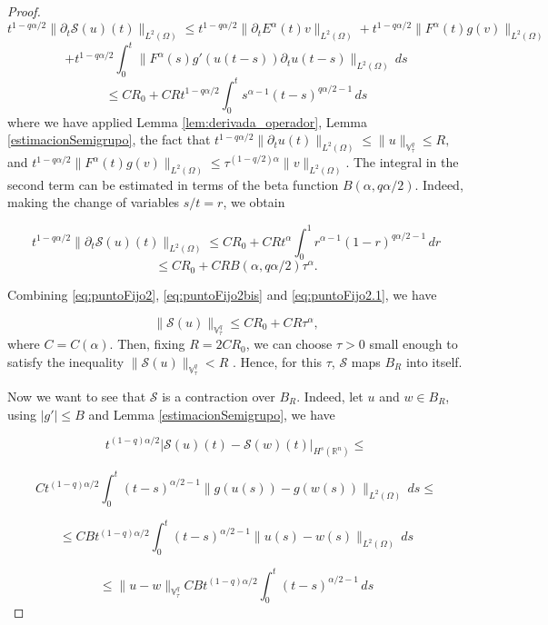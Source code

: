 \documentclass{amsart}
\newcommand{\rn}{{\mathbb{R}^n}}
\newcommand{\ele}{L^2(\Omega)}
\newcommand{\fmonio}{g}
\newcommand{\V}{\mathbb{V}^q}
\theoremstyle{remark}
\theoremstyle{definition}
\numberwithin{equation}{section}
\begin{document}
\begin{proof}
\begin{equation*}
t^{1-q\alpha/2}\| \partial_t \mathcal{S}(u)(t) \|_{\ele} \leq t^{1-q\alpha/2}\|\partial_t E^{\alpha}(t)v\|_{\ele}+ t^{1-q\alpha/2}\| F^{\alpha}(t)\fmonio(v)\|_{\ele} 
\end{equation*}
$$+ t^{1-q\alpha/2}\int^{t}_0 \|F^{\alpha}(s)\fmonio'(u(t-s))\partial_t u(t-s)\|_{\ele}\,ds $$
$$\leq CR_0 + CRt^{1-q\alpha/2}\int^{t}_0 s^{\alpha - 1}(t-s)^{q\alpha/2-1}\,ds  $$
where we have applied Lemma \ref{lem:derivada_operador}, Lemma \ref{estimacionSemigrupo}, the fact that $t^{1-q\alpha/2}\|\partial_t u(t)\|_{\ele} \leq \|u\|_{\V_{\tau}} \leq R,$
 and $t^{1-q\alpha/2}\|F^{\alpha}(t)\fmonio(v)\|_{\ele} \leq \tau^{(1-q/2)\alpha}\|v\|_{\ele}$.
The integral in the second term can be estimated in terms of the beta function $B(\alpha,q\alpha/2)$. Indeed, making the change of variables $s/t = r$, we obtain 

\begin{equation}
t^{1-q\alpha/2}\| \partial_t \mathcal{S}(u)(t) \|_{\ele} \leq CR_0 + CRt^{\alpha}\int^{1}_0 r^{\alpha - 1}(1-r)^{q\alpha/2-1}\,dr 
\label{eq:puntoFijo2.1}
\end{equation}
$$ \leq CR_0 + CRB(\alpha,q\alpha/2)\tau^{\alpha}. $$


  Combining \eqref{eq:puntoFijo2}, \eqref{eq:puntoFijo2bis} and \eqref{eq:puntoFijo2.1}, we have 

$$\|\mathcal{S}(u)\|_{\V_{\tau}} \leq CR_0 + CR\tau^{\alpha}, $$
where $C=C(\alpha)$. 
Then, fixing $R = 2CR_0$, we can choose $\tau>0$ small enough to satisfy the inequality $\| \mathcal{S}(u) \|_{\V_{\tau}} < R$ . Hence, for this $\tau$, $\mathcal{S}$ maps $B_R$ into itself.

Now we want to see that $\mathcal{S}$ is a contraction over $B_R$. Indeed, let $u$ and $w \in B_{R}$, using $|\fmonio'| \leq B$ and Lemma \ref{estimacionSemigrupo}, we have 

\begin{equation}
\label{eq:contraccion}
 t^{(1-q)\alpha/2}|\mathcal{S}(u)(t) - \mathcal{S}(w)(t)  |_{H^s(\rn)} \leq 
\end{equation}

$$
Ct^{(1-q)\alpha/2}\int^{t}_0 (t-s)^{\alpha/2 - 1}\|\fmonio(u(s)) - \fmonio(w(s))\|_{\ele}\,ds \leq 
$$

$$\leq CBt^{(1-q)\alpha/2}\int^{t}_0 (t-s)^{\alpha/2 - 1}\|u(s) - w(s)\|_{\ele}\,ds  $$

$$\leq \|u - w\|_{\V_{\tau}}CBt^{(1-q)\alpha/2}\int^{t}_0 (t-s)^{\alpha/2 - 1}\,ds $$


\end{proof}
\end{document}
